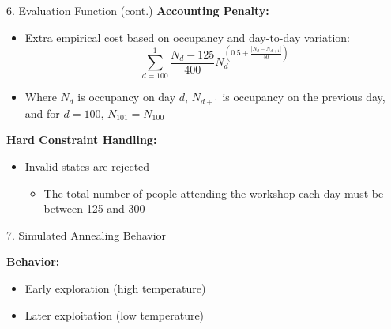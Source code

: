 \documentclass[aspectratio=169]{beamer}
\begin{document}
\begin{frame}{6. Evaluation Function (cont.)}
\textbf{Accounting Penalty:}
\begin{itemize}
    \item Extra empirical cost based on occupancy and day-to-day variation:
\[
\sum_{d=100}^{1} \frac{N_d - 125}{400} N_d^{\left(0.5 + \frac{|N_d - N_{d+1}|}{50}\right)}
\]
    \item Where $N_d$ is occupancy on day $d$, $N_{d+1}$ is occupancy on the previous day, and for $d=100$, $N_{101}=N_{100}$
\end{itemize}
\vspace{0.3cm}
\textbf{Hard Constraint Handling:}
\begin{itemize}
    \item Invalid states are rejected
     \begin{itemize}
        \item The total number of people attending the workshop each day must be between 125 and 300
     \end{itemize}
\end{itemize}

\vspace{0.3cm}

\end{frame}


\begin{frame}{7. Simulated Annealing Behavior}

\begin{center}
\end{center}

\vspace{0.2cm}

\textbf{Behavior:}
\begin{itemize}
    \item Early exploration (high temperature)
    \item Later exploitation (low temperature)
\end{itemize}

\end{frame}
\end{document}
